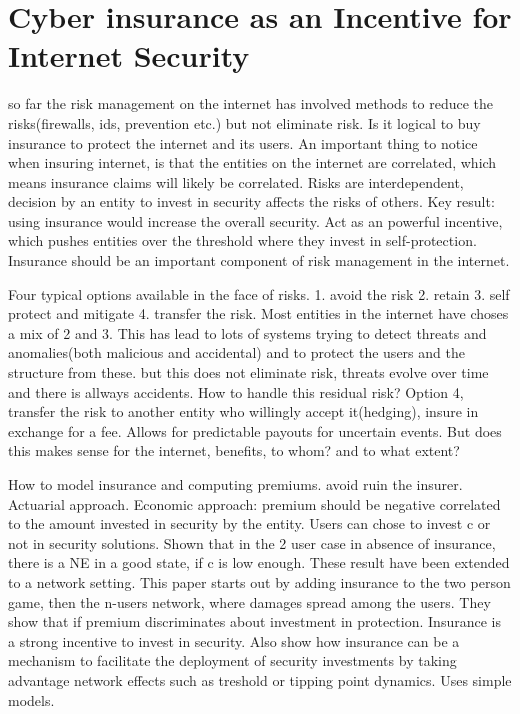 \section{Cyber insurance as an Incentive for Internet Security}\label{sec:first_section}
so far the risk management on the internet has involved methods to reduce the
risks(firewalls, ids, prevention etc.) but not eliminate risk. Is it logical to buy
insurance to protect the internet and its users.
An important thing to notice when insuring internet, 
is that the entities on the internet are correlated, 
which means insurance claims will likely be correlated. Risks are interdependent, 
decision by an entity to invest in security affects the risks of others.
Key result: using insurance would increase the overall security. 
Act as an powerful incentive, which pushes entities over the threshold where they invest in self-protection.
 Insurance should be an important component of risk management in the internet.

Four typical options available in the face of risks. 
1. avoid the risk 2. retain 3. self protect and mitigate 4. transfer the risk.
Most entities in the internet have choses a mix of 2 and 3. This has lead to 
lots of systems trying to detect threats and anomalies(both malicious and accidental)
 and to protect the users and the structure from these.
but this does not eliminate risk, threats evolve over time and there is allways accidents.
How to handle this residual risk?
Option 4, transfer the risk to another entity who willingly accept it(hedging),
 insure in exchange for a fee. Allows for predictable payouts for uncertain events.
But does this makes sense for the internet, benefits, to whom? and to what extent?

How to model insurance and computing premiums. avoid ruin the insurer. Actuarial approach.
 Economic approach:  premium should be negative correlated to the amount
invested in security by the entity. Users can chose to invest c or not in security
solutions. Shown that in the 2 user case in absence of insurance, there is a NE
in a good state, if c is low enough. These result have been extended to a
network setting. This paper starts out by adding insurance to the two person game,
 then the n-users network, where damages spread among the users. 
 They show that if premium discriminates about investment in protection.
  Insurance is a strong incentive to invest in security.
   Also show how insurance can be a mechanism to facilitate the deployment of security
    investments by taking advantage network effects such as treshold or tipping point dynamics. 
    Uses simple models. 

